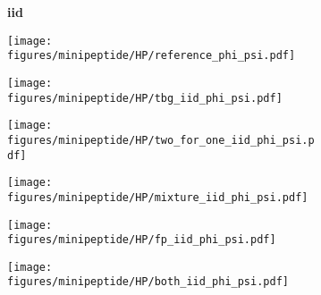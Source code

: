 \begin{figure}
    \begin{minipage}{\textwidth}
        \begin{subfigure}[c]{0.05\textwidth}
        \vspace{-0.2cm}
            \textbf{iid}
        \end{subfigure}
        \begin{subfigure}[c]{0.15\textwidth}
            \centering
            \texttt{[image: figures/minipeptide/HP/reference\_phi\_psi.pdf]}
        \end{subfigure}
        \begin{subfigure}[c]{0.15\textwidth}
            \centering
            \texttt{[image: figures/minipeptide/HP/tbg\_iid\_phi\_psi.pdf]}
        \end{subfigure}
        \begin{subfigure}[c]{0.15\textwidth}
            \centering
            \texttt{[image: figures/minipeptide/HP/two\_for\_one\_iid\_phi\_psi.pdf]}
        \end{subfigure}
        \begin{subfigure}[c]{0.15\textwidth}
            \centering
            \texttt{[image: figures/minipeptide/HP/mixture\_iid\_phi\_psi.pdf]}
        \end{subfigure}
        \begin{subfigure}[c]{0.15\textwidth}
            \centering
            \texttt{[image: figures/minipeptide/HP/fp\_iid\_phi\_psi.pdf]}
        \end{subfigure}
        \begin{subfigure}[c]{0.15\textwidth}
            \centering
            \texttt{[image: figures/minipeptide/HP/both\_iid\_phi\_psi.pdf]}         
        \end{subfigure}
    \end{minipage}


\end{figure}
